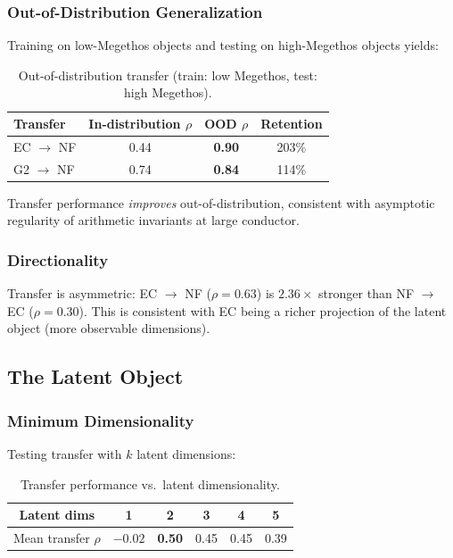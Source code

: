 \documentclass[11pt,a4paper]{article}
\begin{document}
\subsubsection{Out-of-Distribution Generalization}

Training on low-Megethos objects and testing on high-Megethos objects yields:

\begin{table}[h]
\centering
\caption{Out-of-distribution transfer (train: low Megethos, test: high Megethos).}
\label{tab:ood}
\begin{tabular}{lccc}
\toprule
Transfer & In-distribution $\rho$ & OOD $\rho$ & Retention \\
\midrule
EC $\to$ NF & 0.44 & \textbf{0.90} & 203\% \\
G2 $\to$ NF & 0.74 & \textbf{0.84} & 114\% \\
\bottomrule
\end{tabular}
\end{table}

Transfer performance \emph{improves} out-of-distribution, consistent with asymptotic regularity of arithmetic invariants at large conductor.

\subsubsection{Directionality}

Transfer is asymmetric: EC $\to$ NF ($\rho = 0.63$) is $2.36\times$ stronger than NF $\to$ EC ($\rho = 0.30$). This is consistent with EC being a richer projection of the latent object (more observable dimensions).

\subsection{The Latent Object}

\subsubsection{Minimum Dimensionality}

Testing transfer with $k$ latent dimensions:

\begin{table}[h]
\centering
\caption{Transfer performance vs.\ latent dimensionality.}
\label{tab:latent}
\begin{tabular}{cccccc}
\toprule
Latent dims & 1 & 2 & 3 & 4 & 5 \\
\midrule
Mean transfer $\rho$ & $-0.02$ & \textbf{0.50} & 0.45 & 0.45 & 0.39 \\
\bottomrule
\end{tabular}
\end{table}
\end{document}
